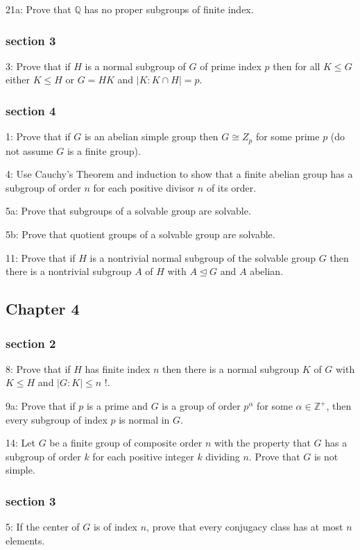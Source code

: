 \documentclass{article}
\begin{document}
21a: Prove that $\mathbb{Q}$ has no proper subgroups of finite index.

\subsubsection*{section 3}
3: Prove that if $H$ is a normal subgroup of $G$ of prime index $p$ then for all $K \leq G$ either $K \leq H$ or $G=H K$ and $|K: K \cap H|=p$.

\subsubsection*{section 4}
1: Prove that if $G$ is an abelian simple group then $G \cong Z_{p}$ for some prime $p$ (do not assume $G$ is a finite group).

4: Use Cauchy's Theorem and induction to show that a finite abelian group has a subgroup of order $n$ for each positive divisor $n$ of its order. 

5a: Prove that subgroups of a solvable group are solvable.

5b: Prove that quotient groups of a solvable group are solvable.

11: Prove that if $H$ is a nontrivial normal subgroup of the solvable group $G$ then there is a nontrivial subgroup $A$ of $H$ with $A \unlhd G$ and $A$ abelian.

\subsection*{Chapter 4}
\subsubsection*{section 2}
8: Prove that if $H$ has finite index $n$ then there is a normal subgroup $K$ of $G$ with $K \leq H$ and $|G: K| \leq n$ !.

9a: Prove that if $p$ is a prime and $G$ is a group of order $p^{\alpha}$ for some $\alpha \in \mathbb{Z}^{+}$, then every subgroup of index $p$ is normal in $G$. 

14: Let $G$ be a finite group of composite order $n$ with the property that $G$ has a subgroup of order $k$ for each positive integer $k$ dividing $n$. Prove that $G$ is not simple.

\subsubsection*{section 3}
5: If the center of $G$ is of index $n$, prove that every conjugacy class has at most $n$ elements.
\end{document}
